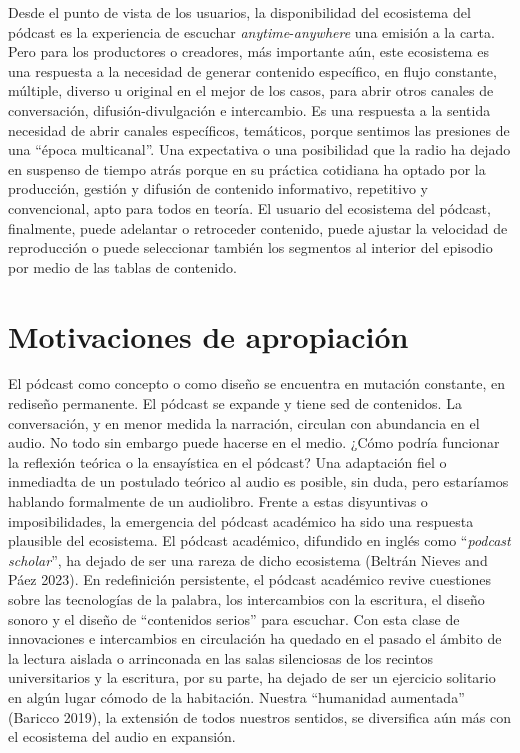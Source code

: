 \documentclass[
]{interact}
\begin{document}
Desde el punto de vista de los usuarios, la disponibilidad del
ecosistema del pódcast es la experiencia de escuchar
\emph{anytime}-\emph{anywhere} una emisión a la carta. Pero para los
productores o creadores, más importante aún, este ecosistema es una
respuesta a la necesidad de generar contenido específico, en flujo
constante, múltiple, diverso u original en el mejor de los casos, para
abrir otros canales de conversación, difusión-divulgación e intercambio.
Es una respuesta a la sentida necesidad de abrir canales específicos,
temáticos, porque sentimos las presiones de una ``época multicanal''.
Una expectativa o una posibilidad que la radio ha dejado en suspenso de
tiempo atrás porque en su práctica cotidiana ha optado por la
producción, gestión y difusión de contenido informativo, repetitivo y
convencional, apto para todos en teoría. El usuario del ecosistema del
pódcast, finalmente, puede adelantar o retroceder contenido, puede
ajustar la velocidad de reproducción o puede seleccionar también los
segmentos al interior del episodio por medio de las tablas de contenido.

\section{Motivaciones de
apropiación}\label{motivaciones-de-apropiaciuxf3n}

El pódcast como concepto o como diseño se encuentra en mutación
constante, en rediseño permanente. El pódcast se expande y tiene sed de
contenidos. La conversación, y en menor medida la narración, circulan
con abundancia en el audio. No todo sin embargo puede hacerse en el
medio. ¿Cómo podría funcionar la reflexión teórica o la ensayística en
el pódcast? Una adaptación fiel o inmediadta de un postulado teórico al
audio es posible, sin duda, pero estaríamos hablando formalmente de un
audiolibro. Frente a estas disyuntivas o imposibilidades, la emergencia
del pódcast académico ha sido una respuesta plausible del ecosistema. El
pódcast académico, difundido en inglés como ``\emph{podcast scholar}'',
ha dejado de ser una rareza de dicho ecosistema (Beltrán Nieves and Páez
2023). En redefinición persistente, el pódcast académico revive
cuestiones sobre las tecnologías de la palabra, los intercambios con la
escritura, el diseño sonoro y el diseño de ``contenidos serios'' para
escuchar. Con esta clase de innovaciones e intercambios en circulación
ha quedado en el pasado el ámbito de la lectura aislada o arrinconada en
las salas silenciosas de los recintos universitarios y la escritura, por
su parte, ha dejado de ser un ejercicio solitario en algún lugar cómodo
de la habitación. Nuestra ``humanidad aumentada'' (Baricco 2019), la
extensión de todos nuestros sentidos, se diversifica aún más con el
ecosistema del audio en expansión.
\end{document}
